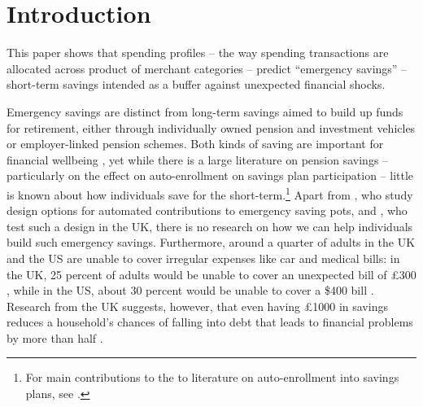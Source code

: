 
\section{Introduction}%
\label{sec:introduction}

This paper shows that spending profiles -- the way spending
transactions are allocated across product of merchant categories --
predict ``emergency savings'' -- short-term savings intended as a buffer
against unexpected financial shocks.

Emergency savings are distinct from long-term savings aimed to build up funds
for retirement, either through individually owned pension and investment
vehicles or employer-linked pension schemes. Both kinds of saving are important
for financial wellbeing \citep{mps2018building, cfpb2017financial}, yet while
there is a large literature on pension savings -- particularly on the effect on
auto-enrollment on savings plan participation -- little is known about how
individuals save for the short-term.\footnote{For main contributions to the to
literature on auto-enrollment into savings plans, see \citet{madrian2001power,
choi2002defined, choi2004better, beshears2009importance}.} Apart from
\citet{beshears2020building}, who study design options for automated
contributions to emergency saving pots, and \citet{phillips2021supporting}, who
test such a design in the UK, there is no research on how we can help
individuals build such emergency savings. Furthermore, around a quarter of
adults in the UK and the US are unable to cover irregular expenses like car and
medical bills: in the UK, 25 percent of adults would be unable to cover an
unexpected bill of \pounds300 \citep{phillips2021supporting}, while in the US,
about 30 percent would be unable to cover a \$400 bill \citep{fed2022economic}.
Research from the UK suggests, however, that even having \pounds1000 in savings
reduces a household's chances of falling into debt that leads
to financial problems by more than half \citep{phillips2021supporting}.


